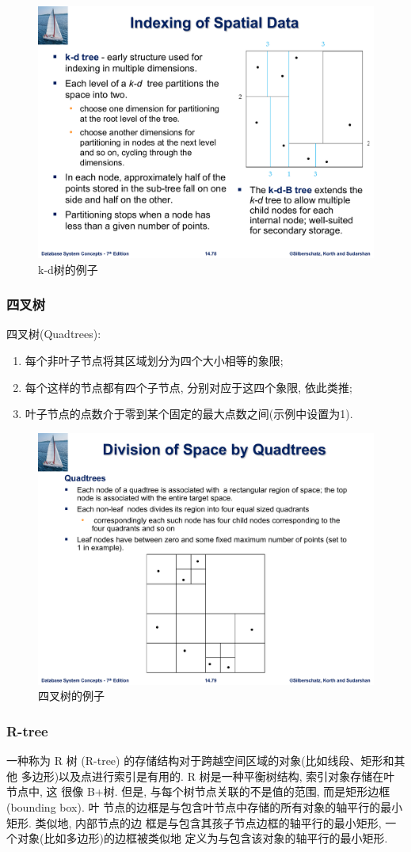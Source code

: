 \begin{figure}[H]
    \centering
    \includegraphics[width=.4\textwidth]{figure/k-d-tree.pdf}
    \caption{k-d树的例子}
\end{figure}

\subsubsection{四叉树}

四叉树(Quadtrees):
\begin{enumerate}
    \item 每个非叶子节点将其区域划分为四个大小相等的象限;
    \item 每个这样的节点都有四个子节点, 分别对应于这四个象限, 依此类推;
    \item 叶子节点的点数介于零到某个固定的最大点数之间(示例中设置为1).
\end{enumerate}

\begin{figure}[H]
    \centering
    \includegraphics[width=.4\textwidth]{figure/四叉树.pdf}
    \caption{四叉树的例子}
\end{figure}

\subsubsection{R-tree}

一种称为 R 树 (R-tree) 的存储结构对于跨越空间区域的对象(比如线段、矩形和其他
多边形)以及点进行索引是有用的. R 树是一种平衡树结构, 索引对象存储在叶节点中, 这
很像 B+树. 但是, 与每个树节点关联的不是值的范围, 而是矩形边框 (bounding box). 叶
节点的边框是与包含叶节点中存储的所有对象的轴平行的最小矩形. 类似地, 内部节点的边
框是与包含其孩子节点边框的轴平行的最小矩形, 一个对象(比如多边形)的边框被类似地
定义为与包含该对象的轴平行的最小矩形.

